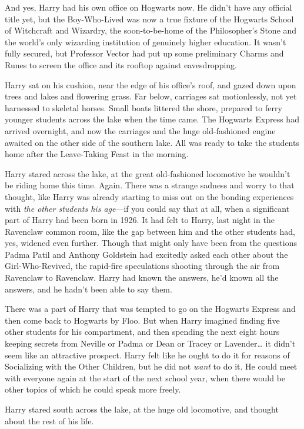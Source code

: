 And yes, Harry had his own office on Hogwarts now. He didn't have any official title yet, but the Boy-Who-Lived was now a true fixture of the Hogwarts School of Witchcraft and Wizardry, the soon-to-be-home of the Philosopher's Stone and the world's only wizarding institution of genuinely higher education. It wasn't fully secured, but Professor Vector had put up some preliminary Charms and Runes to screen the office and its rooftop against eavesdropping.

Harry sat on his cushion, near the edge of his office's roof, and gazed down upon trees and lakes and flowering grass. Far below, carriages sat motionlessly, not yet harnessed to skeletal horses. Small boats littered the shore, prepared to ferry younger students across the lake when the time came. The Hogwarts Express had arrived overnight, and now the carriages and the huge old-fashioned engine awaited on the other side of the southern lake. All was ready to take the students home after the Leave-Taking Feast in the morning.

Harry stared across the lake, at the great old-fashioned locomotive he wouldn't be riding home this time. Again. There was a strange sadness and worry to that thought, like Harry was already starting to miss out on the bonding experiences with \emph{the other students his age}—if you could say that at all, when a significant part of Harry had been born in 1926. It had felt to Harry, last night in the Ravenclaw common room, like the gap between him and the other students had, yes, widened even further. Though that might only have been from the questions Padma Patil and Anthony Goldstein had excitedly asked each other about the Girl-Who-Revived, the rapid-fire speculations shooting through the air from Ravenclaw to Ravenclaw. Harry had known the answers, he'd known all the answers, and he hadn't been able to say them.

There was a part of Harry that was tempted to go on the Hogwarts Express and then come back to Hogwarts by Floo. But when Harry imagined finding five other students for his compartment, and then spending the next eight hours keeping secrets from Neville or Padma or Dean or Tracey or Lavender{\ldots} it didn't seem like an attractive prospect. Harry felt like he ought to do it for reasons of Socializing with the Other Children, but he did not \emph{want} to do it. He could meet with everyone again at the start of the next school year, when there would be other topics of which he could speak more freely.

Harry stared south across the lake, at the huge old locomotive, and thought about the rest of his life.

